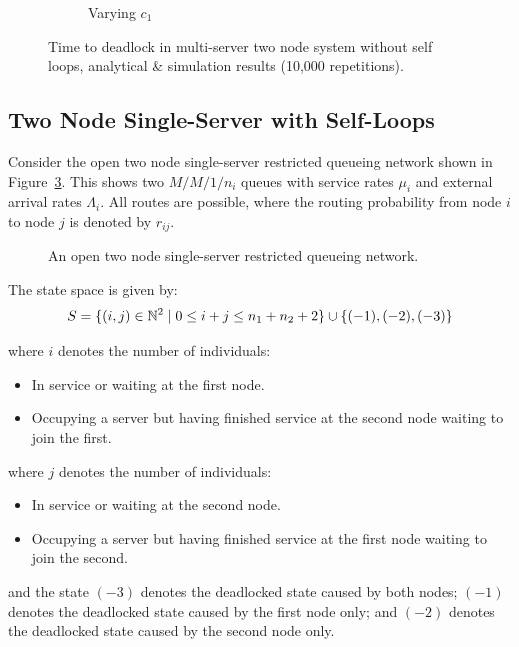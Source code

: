 \documentclass{article}
\numberwithin{equation}{section}
\begin{document}
\begin{figure}[!htbp]
\begin{center}
\begin{subfigure}[b]{0.48\textwidth}
    \caption{Varying $c_1$}
    \label{fig:2Nms_c}
  \end{subfigure}
  \end{center}
  \caption{Time to deadlock in multi-server two node system without self loops,
  analytical \& simulation results (10,000 repetitions).}
  \label{fig:timestodeadlock2nodemultiserver}
\end{figure}


\subsection{Two Node Single-Server with Self-Loops}\label{sec:2nodeselfloops}

Consider the open two node single-server restricted queueing network shown in
Figure~\ref{fig:queueingnetwork_2nodesfeedback}.
This shows two \(M/M/1/n_i\) queues with service rates $\mu_i$  and external
arrival rates $\Lambda_i$.
All routes are possible, where the routing probability from node $i$ to node
$j$ is denoted by $r_{ij}$.

\begin{figure}[!htbp]
  \begin{center}
  
  \end{center}
  \caption{An open two node single-server restricted queueing network.}
  \label{fig:queueingnetwork_2nodesfeedback}
\end{figure}

The state space is given by:
    \[S = \{(i,j)\in\mathbb{N}^2 \nonscript\; | \nonscript\; 0 \leq i + j \leq n_1 + n_2 + 2 \}\cup\{(-1), (-2), (-3)\}\]

    where \(i\) denotes the number of individuals:
        \begin{itemize}
            \item In service or waiting at the first node.
            \item Occupying a server but having finished service at the
                second node waiting to join the first.
        \end{itemize}
    where \(j\) denotes the number of individuals:
        \begin{itemize}
            \item In service or waiting at the second node.
            \item Occupying a server but having finished service at the
                first node waiting to join the second.
        \end{itemize}
    and the state $(-3)$ denotes the deadlocked state caused by both nodes;
    $(-1)$ denotes the deadlocked state caused by the first node only; and
    $(-2)$ denotes the deadlocked state caused by the second node only.
\end{document}
